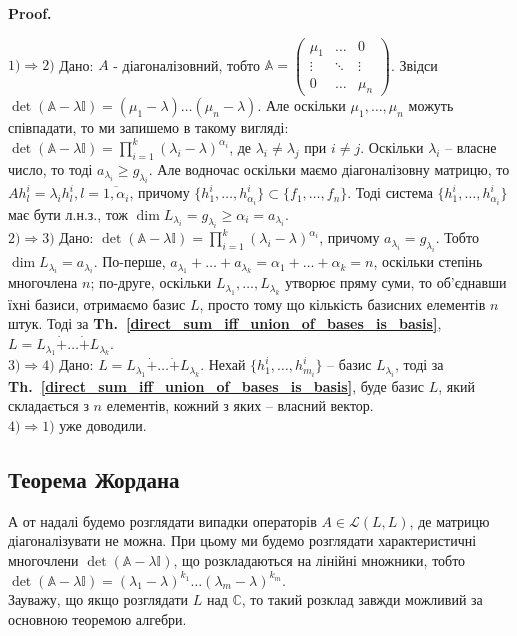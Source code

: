 \documentclass[a4paper, 10pt]{article}
\makeatletter
\theoremstyle{theoremdd}
\newcommand\thref[1]{\textbf{Th.~\ref{#1}}}
\renewenvironment{proof}[1][Proof.\\]{\par
\pushQED{\hfill \qed}%
\normalfont \topsep6\p@\@plus6\p@\relax
\trivlist
\item\relax
{\bfseries
#1\@addpunct{.}}\hspace\labelsep\ignorespaces
}{%
\popQED\endtrivlist\@endpefalse
}
\makeatother
\begin{document}
\begin{proof}
$\boxed{1) \Rightarrow 2)}$ Дано: $A$ - діагоналізовний, тобто $\mathbb{A} = \begin{pmatrix}
\mu_1 & \dots & 0 \\
\vdots & \ddots & \vdots \\
0 & \dots & \mu_n
\end{pmatrix}$. Звідси $\det (\mathbb{A}-\lambda \mathbb{I}) = (\mu_1 - \lambda) \dots (\mu_n - \lambda)$. Але оскільки $\mu_1,\dots,\mu_n$ можуть співпадати, то ми запишемо в такому вигляді:\\
$\det (\mathbb{A}-\lambda \mathbb{I}) = \displaystyle\prod_{i=1}^k (\lambda_i - \lambda)^{\alpha_i}$, де $\lambda_i \neq \lambda_j$ при $i \neq j$. Оскільки $\lambda_i$ -- власне число, то тоді $a_{\lambda_i} \geq g_{\lambda_i}$. Але водночас оскільки маємо діагоналізовну матрицю, то $Ah^{i}_l = \lambda_i h^{i}_l, l = \overline{1,\alpha_i}$, причому $\{h^{i}_1,\dots,h^{i}_{\alpha_i}\} \subset \{f_1,\dots,f_n\}$. Тоді система $\{h^{i}_1,\dots,h^{i}_{\alpha_i}\}$ має бути л.н.з., тож $\dim L_{\lambda_i} = g_{\lambda_i} \geq \alpha_i = a_{\lambda_i}$.
\bigskip \\
$\boxed{2) \Rightarrow 3)}$ Дано: $\det (\mathbb{A}-\lambda \mathbb{I}) = \displaystyle\prod_{i=1}^k (\lambda_i - \lambda)^{\alpha_i}$, причому $a_{\lambda_i} = g_{\lambda_i}$. Тобто $\dim L_{\lambda_i} = a_{\lambda_i}$. По-перше, $a_{\lambda_1} + \dots + a_{\lambda_k} = \alpha_1 + \dots + \alpha_k = n$, оскільки степінь многочлена $n$; по-друге, оскільки $L_{\lambda_1},\dots, L_{\lambda_k}$ утворює пряму суми, то об'єднавши їхні базиси, отримаємо базис $L$, просто тому що кількість базисних елементів $n$ штук. Тоді за \thref{direct_sum_iff_union_of_bases_is_basis}, $L = L_{\lambda_1} \dot{+} \dots \dot{+} L_{\lambda_k}$.
\bigskip \\
$\boxed{3) \Rightarrow 4)}$ Дано: $L = L_{\lambda_1} \dot{+} \dots \dot{+} L_{\lambda_k}$. Нехай $\{h_1^i,\dots,h^i_{m_i}\}$ -- базис $L_{\lambda_i}$, тоді за \thref{direct_sum_iff_union_of_bases_is_basis}, буде базис $L$, який складається з $n$ елементів, кожний з яких -- власний вектор.
\bigskip \\
$\boxed{4) \Rightarrow 1)}$ уже доводили.
\end{proof}

\subsection{Теорема Жордана}
А от надалі будемо розглядати випадки операторів $A \in \mathcal{L}(L,L)$, де матрицю діагоналізувати не можна. При цьому ми будемо розглядати характеристичні многочлени $\det (\mathbb{A}-\lambda \mathbb{I})$, що розкладаються на лінійні множники, тобто\\
$\det (\mathbb{A}-\lambda \mathbb{I}) = (\lambda_1 - \lambda)^{k_1} \dots (\lambda_m - \lambda)^{k_m}$.\\
Зауважу, що якщо розглядати $L$ над $\mathbb{C}$, то такий розклад завжди можливий за основною теоремою алгебри.
\end{document}
